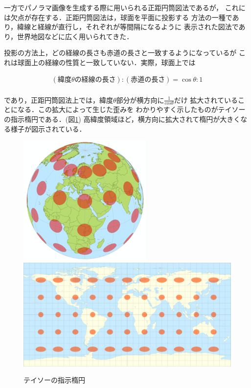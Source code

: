 一方でパノラマ画像を生成する際に用いられる正距円筒図法であるが，
これには欠点が存在する．正距円筒図法は，球面を平面に投影する
方法の一種であり，緯線と経線が直行し，それぞれが等間隔になるように
表示された図法であり，世界地図などに広く用いられてきた．

投影の方法上，どの経線の長さも赤道の長さと一致するようになっているが
これは球面上の経線の性質と一致していない．実際，球面上では

\begin{eqnarray}
  (緯度\theta の経線の長さ):(赤道の長さ)= \cos{\theta}:1 \nonumber \\
\end{eqnarray}

であり，正距円筒図法上では，緯度$\theta$部分が横方向に$\frac{1}{cos\theta}$だけ
拡大されていることになる．この拡大によって生じた歪みを
わかりやすく示したものがテイソーの指示楕円である．(図\ref{teiso})
高緯度領域ほど，横方向に拡大されて楕円が大きくなる様子が図示されている．

\begin{figure}[tp]
  \centering
  \includegraphics[scale=1.0]{fig/teiso1.png}
  \includegraphics[scale=0.2]{fig/teiso2.png}
  \caption{テイソーの指示楕円\cite{20}}\label{teiso}
\end{figure}

